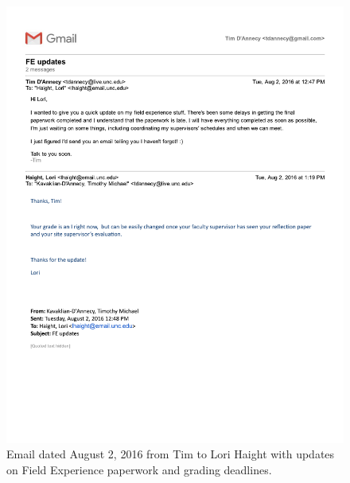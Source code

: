 \begin{figure}
  \centering
  \noindent\includegraphics[page=1,angle=-90,origin=c,width=.75\textwidth,height=.75\textheight]{documents/2016-08-02-Email-Tim-Lori}
 \caption{Email dated August 2, 2016 from Tim to Lori Haight with updates on Field Experience paperwork and grading deadlines.}
 \label{fig:2016-08-02-Email-Tim-Lori}
\end{figure}

